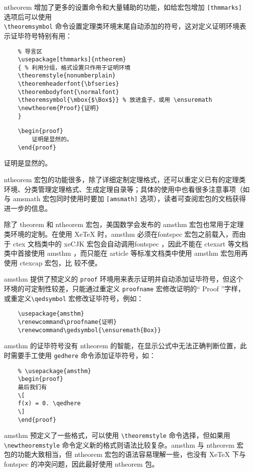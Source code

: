 ntheorem 增加了更多的设置命令和大量辅助的功能，如给宏包增加 \verb|[thmmarks]| 选项后可以使用\\ \verb|\theoremsymbol| 命令设置定理类环境末尾自动添加的符号，这对定义证明环境表示证毕符号特别有用：

\begin{lstlisting}
    % 导言区
    \usepackage[thmmarks]{ntheorem}
    { % 利用分组，格式设置只作用于证明环境
    \theoremstyle{nonumberplain}
    \theoremheaderfont{\bfseries}
    \theorembodyfont{\normalfont}
    \theoremsymbol{\mbox{$\Box$}} % 放进盒子，或用 \ensuremath
    \newtheorem{Proof}{证明}
    }
\end{lstlisting}

\begin{minipage}[t]{0.45\textwidth}
\begin{lstlisting}
    \begin{proof}
        证明是显然的。
    \end{proof}
\end{lstlisting}
\end{minipage}
\hfill
\begin{minipage}[t]{0.45\textwidth}
    \begin{Proof}
        证明是显然的。
    \end{Proof}
\end{minipage}

ntheorem 宏包的功能很多，除了详细定制定理格式，还可以重定义已有的定理类环境、分类管理定理格式、生成定理自录等；具体的使用中也看很多注意事项（如与 amsmath 宏包同时使用时要加 \verb|[amsmath]| 选项），读者可查阅宏包的文档获得进一步的信息。

除了 theorem 和 ntheorem 宏包，美国数学会发布的 amsthm 宏包也常用于定理类环境的定制。在使用 XeTeX 时，amsthm 必须在fontspec 宏包之前载入，而由于 ctex 文档类中的 xeCJK 宏包会自动调用fontspec ，因此不能在 ctexart 等文档类中首接使用 amsthm ，而只能在 article 等标准文档类中使用 amsthm 宏包用再使用 ctexcap 宏包，比
较不便。

amsthm 提供了预定义的 \verb|proof| 环境用来表示证明并自动添加证毕符号，但这个环境的可定制性较差，只能通过重定义 \verb|proofname| 宏修改证明的“ Proof ”字样，或重定义\verb|\qedsymbol| 宏修改证毕符号，例如：
\begin{lstlisting}
    \usepackage{amsthm}
    \renewcommand\proofname{证明}
    \renewcommand\gedsymbol{\ensuremath{Box}}
\end{lstlisting}


amsthm 的证毕符号没有 ntheorem 的智能，在显示公式中无法正确判断位置，此时需要手工使用 \verb|gedhere| 命令添加证毕符号，如：
\begin{lstlisting}
    % \usepackage{amsthm}
    \begin{proof}
    最后我们有
    \[
    f(x) = 0. \qedhere
    \]
    \end{proof}
\end{lstlisting}

amsthm 预定义了一些格式，可以使用 \verb|\theoremstyle| 命令选择，但如果用
\verb|\newtheoremstyle| 命令定义新的格式则语法比较复杂。amsthm 与 ntheorem 宏包的功能大致相当，但 ntheorem 宏包的语法容易理解一些，也没有 XeTeX 下与 fontspec 的冲突问题，因此最好使用 ntheorem 包。